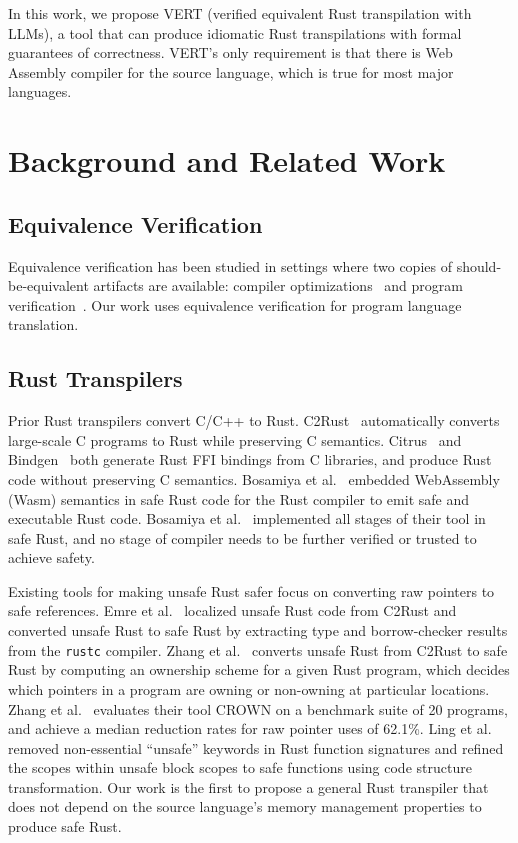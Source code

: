\documentclass[12pt,openany,oneside,table]{cmuthesis}
\begin{document}
In this work, we propose VERT (verified equivalent Rust transpilation with LLMs), a tool that can produce idiomatic Rust transpilations with formal guarantees of correctness. VERT's only requirement is that there is Web
Assembly compiler for the source language, which is true for most major languages. 

\section{Background and Related Work}

\subsection{Equivalence Verification}

Equivalence verification has been studied in settings where two copies of should-be-equivalent artifacts are available: compiler optimizations~\cite{churchill_semantic_2019,churchill_sound_2017} and program verification~\cite{antonopoulos_algebra_2023,kommrusch_self-supervised_2023}. Our work uses equivalence verification for program language translation.

\subsection{Rust Transpilers}

Prior Rust transpilers convert C/C++ to Rust. C2Rust~\cite{C2Rust} automatically converts large-scale C programs to Rust while preserving C semantics. Citrus~\cite{citrus} and Bindgen~\cite{bindgen} both generate Rust FFI bindings from C libraries, and produce Rust code without preserving C semantics. Bosamiya et al.~\cite{bosamiya2022provably} embedded WebAssembly (Wasm) semantics in safe Rust code for the Rust compiler to emit safe and executable Rust code. Bosamiya et al.~\cite{bosamiya2022provably} implemented all stages of their tool in safe Rust, and no stage of compiler needs to be further verified or trusted to achieve safety.

Existing tools for making unsafe Rust safer focus on converting raw pointers to safe references. Emre et al.~\cite{emre2021translating} localized unsafe Rust code from C2Rust and converted unsafe Rust to safe Rust by extracting type and borrow-checker results from the \texttt{rustc} compiler. Zhang et al.~\cite{zhang2023ownership} converts unsafe Rust from C2Rust to safe Rust by computing an ownership scheme for a given Rust program, which decides which pointers in a program are owning or non-owning at particular locations. Zhang et al.~\cite{zhang2023ownership} evaluates their tool CROWN on a benchmark suite of 20 programs, and achieve a median reduction rates for raw pointer uses of 62.1\%. Ling et al.~\cite{ling2022rust} removed non-essential ``unsafe'' keywords in Rust function signatures and refined the scopes within unsafe block scopes to safe functions using code structure transformation. Our work is the first to propose a general Rust transpiler that does not depend on the source language's memory management properties to produce safe Rust.
\end{document}

